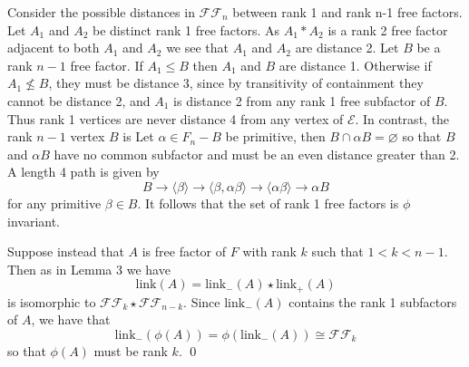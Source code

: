 \documentclass[11pt]{article}
\begin{document}
Consider the possible distances in $\mathcal {FF}_n$ between rank 1 and rank n-1 free factors. Let $A_1$ and $A_2$ be distinct rank 1 free factors. As $A_1 \ast A_2$ is a rank 2 free factor adjacent to both $A_1$ and $A_2$ we see that $A_1$ and $A_2$ are distance 2. 
Let $B$ be a rank $n-1$ free factor. If $A_1 \leq B$ then $A_1$ and $B$ are distance 1. Otherwise if $A_1 \not \leq B$, they must be distance 3, since by transitivity of containment they cannot be distance 2, and $A_1$ is distance 2 from any rank 1 free subfactor of $B$. 
Thus rank 1 vertices are never distance 4 from any vertex of $\mathcal E$.
In contrast, the rank $n-1$ vertex $B$ is 
Let $\alpha \in F_n-B$ be primitive, then $B \cap \alpha B =\varnothing$ so that $B$ and $\alpha B$ have no common subfactor and must be an even distance greater than 2. A length 4 path is given by $$B  \to \langle  \beta \rangle \to \langle \beta , \alpha \beta  \rangle \to \langle \alpha \beta \rangle \to  \alpha B$$ for any primitive $\beta \in B$.
It follows that the set of rank 1 free factors is $\phi$ invariant.

Suppose instead that $A$ is free factor of $F$ with rank $k$ such that  $1<k<n-1$.
Then as in Lemma 3 we have
$$\mbox{link} (A) = \mbox{link}_- (A)  \star \mbox{link}_+ (A)$$ 
is isomorphic to $\mathcal{FF}_{k} \star \mathcal{FF}_{n-k}$.
Since $\mbox{link}_- (A)$ contains the rank 1 subfactors of $A$, we have that 
$$
\mbox{link}_-  \left ( \phi(A)  \right ) 
=
\phi( \mbox{link}_- (A) )
\cong \mathcal{FF}_k
$$
so that $\phi(A)$ must be rank $k$. \qed \\
\\
\end{document}
